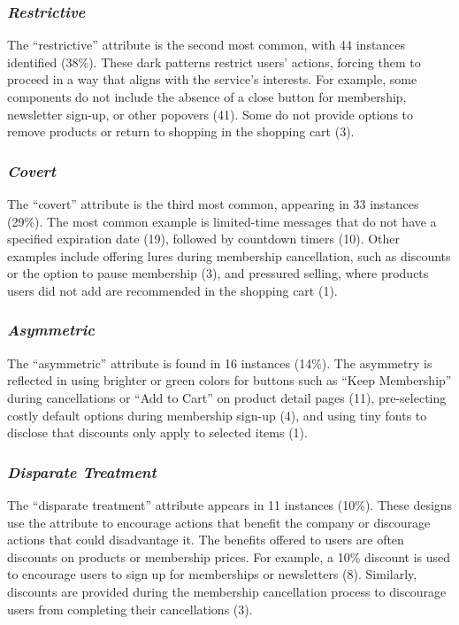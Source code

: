 \subsubsection{\textit{Restrictive}}
The ``restrictive'' attribute is the second most common, with 44 instances identified (38\%). These dark patterns restrict users' actions, forcing them to proceed in a way that aligns with the service's interests. For example, some components do not include the absence of a close button for membership, newsletter sign-up, or other popovers (41). Some do not provide options to remove products or return to shopping in the shopping cart (3).

\subsubsection{\textit{Covert}}
The ``covert'' attribute is the third most common, appearing in 33 instances (29\%). The most common example is limited-time messages that do not have a specified expiration date (19), followed by countdown timers (10). Other examples include offering lures during membership cancellation, such as discounts or the option to pause membership (3), and pressured selling, where products users did not add are recommended in the shopping cart (1).

\subsubsection{\textit{Asymmetric}}
The ``asymmetric'' attribute is found in 16 instances (14\%). The asymmetry is reflected in using brighter or green colors for buttons such as ``Keep Membership'' during cancellations or ``Add to Cart'' on product detail pages (11), pre-selecting costly default options during membership sign-up (4), and using tiny fonts to disclose that discounts only apply to selected items (1).

\subsubsection{\textit{Disparate Treatment}}
The ``disparate treatment'' attribute appears in 11 instances (10\%). These designs use the attribute to encourage actions that benefit the company %
or discourage actions that could disadvantage it. The benefits offered to users are often discounts on products or membership prices. For example, a 10\% discount is used to encourage users to sign up for memberships or newsletters (8). Similarly, discounts are provided during the membership cancellation process to discourage users from completing their cancellations (3).

